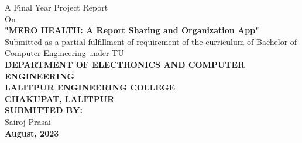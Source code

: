 \begin{titlepage}
    \thispagestyle{empty}
    \centering

   \fontsize{14pt}{14pt}\selectfont
        {A Final Year Project Report}\\ 
        {On}\\[2.5cm]

        
            \textbf{"\MakeUppercase{Mero Health}: A Report Sharing and Organization App"}\\[2cm]
    {Submitted as a partial fulfillment of requirement of the curriculum of Bachelor of Computer Engineering under TU}\\[4cm]
    \textbf{DEPARTMENT OF ELECTRONICS AND COMPUTER ENGINEERING}\\[0.2cm]
    \textbf{LALITPUR ENGINEERING COLLEGE}\\
    \textbf{CHAKUPAT, LALITPUR}\\[3.5cm]
    \textbf{\MakeUppercase{Submitted By:}}\\
    {Sairoj Prasai}\\[2.5cm]
    
    
        \textbf{August, 2023}\\
\end{titlepage}
